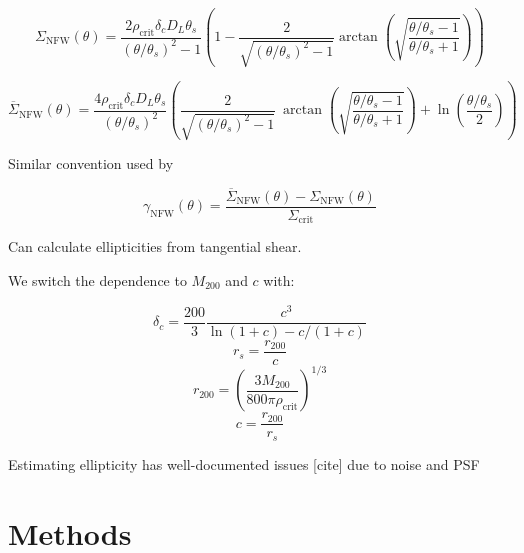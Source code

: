 \documentclass[10pt]{article}
\begin{document}
\[\Sigma_\mathrm{NFW}(\theta) = \frac{2 \rho_\mathrm{crit} \delta_c D_L \theta_s}{(\theta/\theta_s)^2 - 1} \left(1 - \frac{2}{\sqrt{(\theta/\theta_s)^2 - 1}} \arctan\left(\sqrt{\frac{\theta/\theta_s - 1}{\theta/\theta_s + 1}} \right) \right)\]

\[\overline{\Sigma}_\mathrm{NFW}(\theta) = \frac{4 \rho_\mathrm{crit} \delta_c D_L \theta_s}{(\theta/\theta_s)^2} \left(
    \frac{2}{\sqrt{(\theta/\theta_s)^2 - 1}} ~\arctan\left(\sqrt{\frac{\theta/\theta_s - 1}{\theta/\theta_s + 1}} \right) + \ln{\left(\frac{\theta/\theta_s}{2}\right)}
\right)\]

Similar convention used by \citet{Bartelmann2001}

\[\gamma_\mathrm{NFW}(\theta) = \frac{\overline{\Sigma}_\mathrm{NFW}(\theta) - \Sigma_\mathrm{NFW}(\theta)}{\Sigma_\mathrm{crit}} \]

Can calculate ellipticities from tangential shear.

We switch the dependence to $M_{200}$ and $c$ with:

\[\delta_c = \frac{200}{3} \frac{c^3}{\ln(1 + c) - c/(1 + c)}\]
\[r_s = \frac{r_{200}}{c}\]
\[r_{200} = \left( \frac{3 M_{200}}{800 \pi \rho_\mathrm{crit}} \right)^{1/3}\]
\[c = \frac{r_{200}}{r_s}\]

Estimating ellipticity has well-documented issues [cite] due to noise and PSF


\newpage

\section{Methods}
\end{document}
